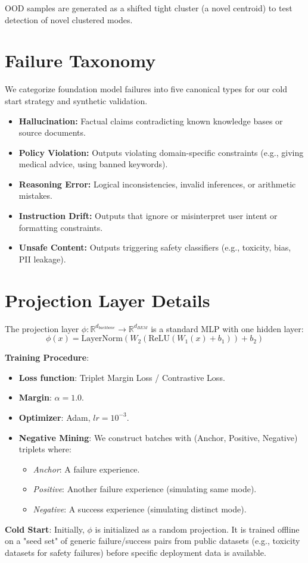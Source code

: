 \documentclass[twoside,11pt]{article}
\begin{document}
OOD samples are generated as a shifted tight cluster (a novel centroid) to test detection of novel clustered modes.

\section{Failure Taxonomy}
\label{app:taxonomy}

We categorize foundation model failures into five canonical types for our cold start strategy and synthetic validation.

\begin{itemize}
    \item \textbf{Hallucination:} Factual claims contradicting known knowledge bases or source documents.
    \item \textbf{Policy Violation:} Outputs violating domain-specific constraints (e.g., giving medical advice, using banned keywords).
    \item \textbf{Reasoning Error:} Logical inconsistencies, invalid inferences, or arithmetic mistakes.
    \item \textbf{Instruction Drift:} Outputs that ignore or misinterpret user intent or formatting constraints.
    \item \textbf{Unsafe Content:} Outputs triggering safety classifiers (e.g., toxicity, bias, PII leakage).
\end{itemize}

\section{Projection Layer Details}
\label{app:projection}

The projection layer $\phi: \mathbb{R}^{d_{backbone}} \to \mathbb{R}^{d_{BEM}}$ is a standard MLP with one hidden layer:
\begin{equation}
    \phi(x) = \text{LayerNorm}(W_2(\text{ReLU}(W_1(x) + b_1)) + b_2)
\end{equation}

\textbf{Training Procedure}:
\begin{itemize}
    \item \textbf{Loss function}: Triplet Margin Loss / Contrastive Loss.
    \item \textbf{Margin}: $\alpha = 1.0$.
    \item \textbf{Optimizer}: Adam, $lr=10^{-3}$.
    \item \textbf{Negative Mining}: We construct batches with (Anchor, Positive, Negative) triplets where:
    \begin{itemize}
        \item \textit{Anchor}: A failure experience.
        \item \textit{Positive}: Another failure experience (simulating same mode).
        \item \textit{Negative}: A success experience (simulating distinct mode).
    \end{itemize}
\end{itemize}

\textbf{Cold Start}: Initially, $\phi$ is initialized as a random projection. It is trained offline on a "seed set" of generic failure/success pairs from public datasets (e.g., toxicity datasets for safety failures) before specific deployment data is available.
\end{document}
